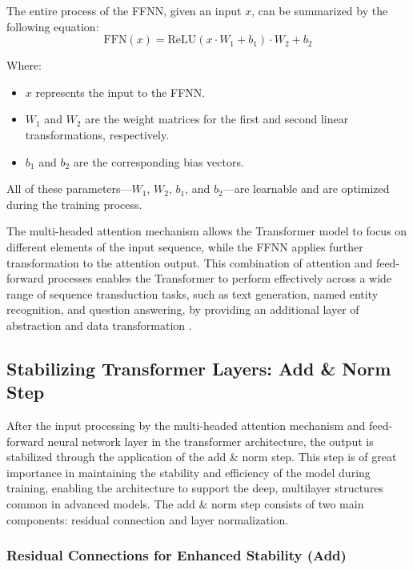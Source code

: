 The entire process of the FFNN, given an input \( x \), can be summarized by the following equation:
\begin{equation}
    \text{FFN}(x) = \text{ReLU}(x \cdot W_1 + b_1) \cdot W_2 + b_2
\end{equation}

Where:
\begin{itemize}
    \item \( x \) represents the input to the FFNN.
    \item \( W_1 \) and \( W_2 \) are the weight matrices for the first and second linear transformations, respectively.
    \item \( b_1 \) and \( b_2 \) are the corresponding bias vectors.
\end{itemize}

All of these parameters—\( W_1 \), \( W_2 \), \( b_1 \), and \( b_2 \)—are learnable and are optimized during the training process.

The multi-headed attention mechanism allows the Transformer model to focus on different elements of the input sequence, while the FFNN applies further transformation to the attention output. This combination of attention and feed-forward processes enables the Transformer to perform effectively across a wide range of sequence transduction tasks, such as text generation, named entity recognition, and question answering, by providing an additional layer of abstraction and data transformation \cite{vaswani2017attention}.

\subsection{Stabilizing Transformer Layers: Add \& Norm Step}

After the input processing by the multi-headed attention mechanism and feed-forward neural network layer in the transformer architecture, the output is stabilized through the application of the add \& norm step. This step is of great importance in maintaining the stability and efficiency of the model during training, enabling the architecture to support the deep, multilayer structures common in advanced models. The add \& norm step consists of two main components: residual connection and layer normalization.

\subsubsection{Residual Connections for Enhanced Stability (Add)}

